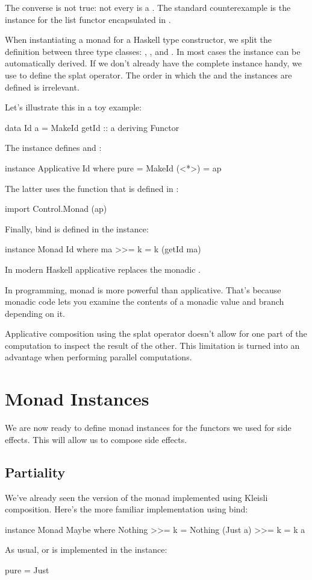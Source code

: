 \documentclass[DaoFP]{subfiles}
\begin{document}
The converse is not true: not every  is a . The standard counterexample is the  instance for the list functor encapsulated in .

When instantiating a monad for a Haskell type constructor, we split the definition between three type classes: , , and . In most cases the  instance can be automatically derived. If we don't already have the complete  instance handy, we use  to define the splat operator. The order in which the  and the  instances are defined is irrelevant.


Let's illustrate this in a toy example:
\begin{haskell}
data Id a = MakeId { getId :: a }
    deriving Functor
\end{haskell}
The  instance defines  and \hask{<*>}:
\begin{haskell}
instance Applicative Id where
    pure = MakeId 
    (<*>) = ap
\end{haskell}
The latter uses the  function that is defined in :
\begin{haskell}
import Control.Monad (ap)
\end{haskell}
Finally, bind is defined in the  instance:
\begin{haskell}
instance Monad Id where
    ma >>= k = k (getId ma)
\end{haskell}
In modern Haskell applicative  replaces the monadic .

In programming, monad is more powerful than applicative. That's because monadic code lets you examine the contents of a monadic value and branch depending on it. 

Applicative composition using the splat operator doesn't allow for one part of the computation to inspect the result of the other. This limitation is turned into an advantage when performing parallel computations.

\section{Monad Instances}

We are now ready to define monad instances for the functors we used for side effects. This will allow us to compose side effects.

\subsection{Partiality}
We've already seen the version of the  monad implemented using Kleisli composition. Here's the more familiar implementation using bind:
\begin{haskell}
instance Monad Maybe where
  Nothing  >>= k = Nothing
  (Just a) >>= k = k a
\end{haskell}
As usual,  or  is implemented in the  instance:
\begin{haskell}
  pure = Just
\end{haskell}
\end{document}
